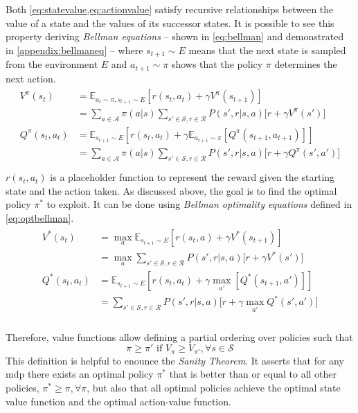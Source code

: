 Both \vref{eq:statevalue,eq:actionvalue} satisfy recursive relationships between the value of a state and the values of its successor states. It is possible to see this property deriving \textit{Bellman equations} -- shown in \vref{eq:bellman} and demonstrated in \vref{appendix:bellmaneq} -- where $s_{t+1}\sim \mathit{E}$ means that the next state is sampled from the environment $E$ and $a_{t+1}\sim \pi$ shows that the policy $\pi$ determines the next action.
\begin{align} \label{eq:bellman}
	\begin{split}
V^\pi(s_t) &= \mathbb{E}_{a_t \sim \pi, s_{t+1} \sim E}[r(s_t, a_t) + \gamma V^\pi(s_{t+1})] \\
		&= \sum_{a \in \mathcal{A}}\pi(a|s)\sum_{s' \in \mathcal{S}, r \in \mathcal{R}}P(s', r | s, a)\big[r + \gamma V^\pi(s')\big]\\
Q^\pi(s_t,a_t) &= \mathbb{E}_{s_{t+1} \sim E}[r(s_t, a_t) + \gamma \mathbb{E}_{ a_{t+1} \sim \pi}[Q^\pi(s_{t+1}, a_{t+1})]]\\
	&= \sum_{a \in \mathcal{A}}\pi(a|s)\sum_{s' \in \mathcal{S}, r \in \mathcal{R}}P(s', r | s, a)\big[r + \gamma Q^\pi(s',a')\big]\\
\end{split}
\end{align}
 $r(s_t, a_t)$ is a placeholder function to represent the reward given the starting state and the action taken.
As discussed above, the goal is to find the optimal policy $\pi^*$ to exploit. It can be done using \textit{Bellman optimality equations} defined in \vref{eq:optbellman}. 
\begin{align} \label{eq:optbellman}
\begin{split}
V^*(s_t) &= \max_{a} \mathbb{E}_{s_{t+1} \sim E}[r(s_t, a) + \gamma V^*(s_{t+1})] \\
		&= \max_{a}\sum_{s' \in \mathcal{S}, r \in \mathcal{R}}P(s', r | s, a)\big[r + \gamma V^*(s')\big]\\
Q^*(s_t,a_t) &= \mathbb{E}_{s_{t+1} \sim E}[r(s_t, a_t) + \gamma \max_{a'}[Q^*(s_{t+1}, a')]]\\
			&= \sum_{s' \in \mathcal{S}, r \in \mathcal{R}}P(s', r | s, a)\big[r + \gamma \max_{a'} Q^*(s',a')\big]\\
\end{split}
\end{align}

Therefore, value functions allow defining a partial ordering over policies such that \[\pi \ge \pi' \text{ if } V_\pi \ge V_{\pi'},\forall s \in \mathcal{S}\]
This definition is helpful to enounce the \textit{Sanity Theorem}. It asserts that for any \acrshort{mdp} there exists an optimal policy $\pi^*$ that is better than or equal to all other policies, $\pi^* \ge \pi, \forall \pi$, but also that all optimal policies achieve the optimal state value function and the optimal action-value function.

